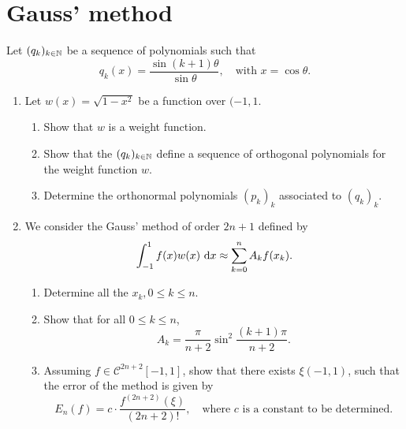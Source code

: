 \section{Gauss' method}
Let \((q_k)_{k\in\mathbb{N}}\) be a sequence of polynomials such that
\[ q_k(x)=\frac{\sin(k+1)\theta}{\sin\theta}, \quad\text{with } x=\cos\theta. \]
\begin{enumerate}
	\item Let \(w(x)=\sqrt{1-x^2}\) be a function over \((-1,1\).
	\begin{enumerate}
		\item Show that $w$ is a weight function.
		\item Show that the \((q_k)_{k\in\mathbb{N}}\) define a sequence of orthogonal polynomials for the weight function $w$.
		\item Determine the orthonormal polynomials \((p_k)_k\) associated to \((q_k)_k\).
	\end{enumerate}
	\item We consider the Gauss' method of order \(2n+1\) defined by
	\[ \int_{-1}^{1}f(x)w(x)~\mathrm{d} x\approx \sum_{k=0}^{n}A_kf(x_k). \]
	\begin{enumerate}
		\item Determine all the \(x_k,0\leq k\leq n\).
		\item Show that for all \(0\leq k\leq n\),
		\[ A_k=\frac{\pi}{n+2}\sin^2\frac{(k+1)\pi}{n+2}. \]
		\item Assuming \(f\in\mathcal{C}^{2n+2}[−1, 1]\), show that there exists \(\xi(−1,1)\), such that the error of the method is given by
		\[ E_n(f)=c\cdot\frac{f^{(2n+2)}(\xi)}{(2n+2)!},\quad \text{where }c\text{ is a constant to be determined.} \]
	\end{enumerate}
\end{enumerate}